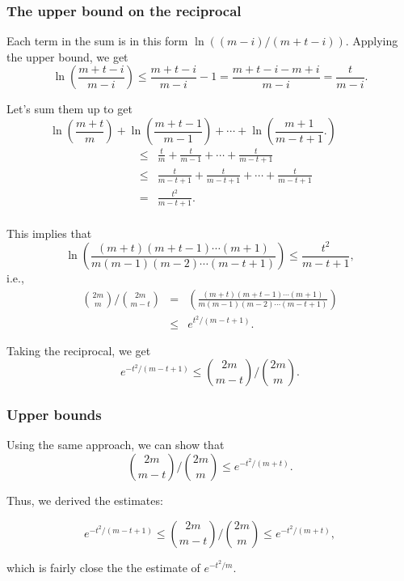 \begin{frame}\frametitle{The upper bound on the reciprocal}
  Each term in the sum is in this form $\ln((m-i)/(m+t-i))$.  Applying
  the upper bound, we get
  \[ \ln\left(\frac{m+t-i}{m-i}\right) \leq \frac{m+t-i}{m-i}-1 = \frac{m+t-i-m+i}{m-i}=\frac{t}{m-i}.\]
  \pause

  Let's sum them up to get
  \[
    \ln\left(\frac{m+t}{m}\right) +
    \ln\left(\frac{m+t-1}{m-1}\right)+\cdots+
    \ln\left(\frac{m+1}{m-t+1}.\right) \quad\quad\quad
  \]
  \begin{eqnarray*}
    \quad\quad &\leq&
    \frac{t}{m} + \frac{t}{m-1} + \cdots + \frac{t}{m-t+1} \\
    &\leq&
    \frac{t}{m-t+1} + \frac{t}{m-t+1} + \cdots + \frac{t}{m-t+1} \\
    & = & \frac{t^2}{m-t+1}. \\
  \end{eqnarray*}
\end{frame}

\begin{frame}
  This implies that
  \[
  \ln\left(\frac{(m+t)(m+t-1)\cdots(m+1)}{m(m-1)(m-2)\cdots(m-t+1)}\right)
  \leq \frac{t^2}{m-t+1},
  \]
  i.e.,
  \begin{eqnarray*}
    \binom{2m}{m}\Big/\binom{2m}{m-t} &=& 
    \left(\frac{(m+t)(m+t-1)\cdots(m+1)}{m(m-1)(m-2)\cdots(m-t+1)}\right)\\
    &\leq& e^{t^2/(m-t+1)}.
  \end{eqnarray*}
  \pause

  Taking the reciprocal, we get
  \[
  e^{-t^2/(m-t+1)}\leq
  \binom{2m}{m-t}\Big/\binom{2m}{m}.
  \]
\end{frame}

\begin{frame}\frametitle{Upper bounds}
  Using the same approach, we can show that
  \[
  \binom{2m}{m-t}\Big/\binom{2m}{m}\leq e^{-t^2/(m+t)}.
  \]
  \pause

  Thus, we derived the estimates:
  \begin{tcolorbox}
    \[
    e^{-t^2/(m-t+1)}\leq
    \binom{2m}{m-t}\Big/\binom{2m}{m}
    \leq e^{-t^2/(m+t)},
    \]
  \end{tcolorbox}
  \pause
  which is fairly close the the estimate of $e^{-t^2/m}$.
\end{frame}

